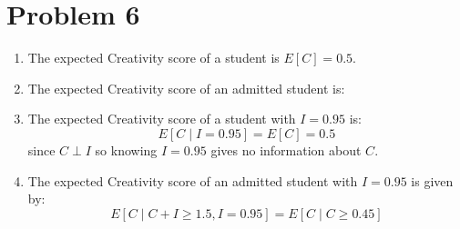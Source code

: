 \documentclass[12pt]{article}
\begin{document}
\pagebreak
\section*{Problem 6}

\begin{enumerate}
\item The expected Creativity score of a student is $E[C] = 0.5$.
\item The expected Creativity score of an admitted student is:
\item The expected Creativity score of a student with $I = 0.95$ is:
$$
E[C \mid I = 0.95] = E[C] = 0.5
$$
since $C \perp I$ so knowing $I = 0.95$ gives no information about $C$.
\item The expected Creativity score of an admitted student with $I = 0.95$ is given by:
$$
E[C \mid C + I \geq 1.5, I = 0.95] = E[C \mid C \geq 0.45]
$$
\end{enumerate}
\end{document}
